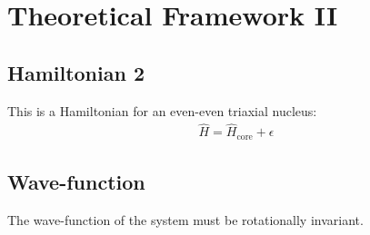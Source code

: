 \chapter{Theoretical Framework II}

\section{Hamiltonian 2}

This is a Hamiltonian for an even-even triaxial nucleus:
\begin{align}
    \hat{H}=\hat{H}_\text{core}+\epsilon
\end{align}

\lipsum[1-2]

\section{Wave-function}

The wave-function of the system must be rotationally invariant.

\lipsum[1-2]